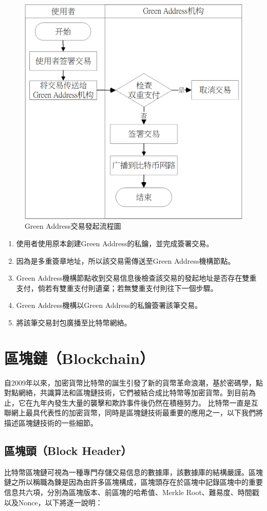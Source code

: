 			 	\begin{figure}[htbp]
					\centering
					\includegraphics[width = .6\textwidth]{gatx.png}
					\caption{Green Address交易發起流程圖}\label{gatx}
				\end{figure}

				\begin{enumerate}
					\item 使用者使用原本創建Green Address的私鑰，並完成簽署交易。
					\item 因為是多重簽章地址，所以該交易需傳送至Green Address機構節點。
					\item Green Address機構節點收到交易信息後檢查該交易的發起地址是否存在雙重支付，倘若有雙重支付則遺棄；若無雙重支付則往下一個步驟。
					\item Green Address機構以Green Address的私鑰簽署該筆交易。
					\item 將該筆交易封包廣播至比特幣網絡。
				\end{enumerate}

		\section{區塊鏈（Blockchain）}
		自2009年以來，加密貨幣比特幣的誕生引發了新的貨幣革命浪潮，基於密碼學，點對點網絡，共識算法和區塊鏈技術，它們被結合成比特幣等加密貨幣。到目前為止，它在九年內發生大量的襲擊和欺詐事件後仍然在積極努力。 比特幣一直是互聯網上最具代表性的加密貨幣，同時是區塊鏈技術最重要的應用之一，以下我們將描述區塊鏈技術的一些細節。

			\subsection{區塊頭（Block Header）}
			比特幣區塊鏈可視為一種專門存儲交易信息的數據庫，該數據庫的結構嚴謹。區塊鏈之所以稱職為鍊是因為由許多區塊構成，區塊頭存在於區塊中記錄區塊中的重要信息共六項，分別為區塊版本、前區塊的哈希值、Merkle Root、難易度、時間戳以及Nonce，以下將逐一說明：

